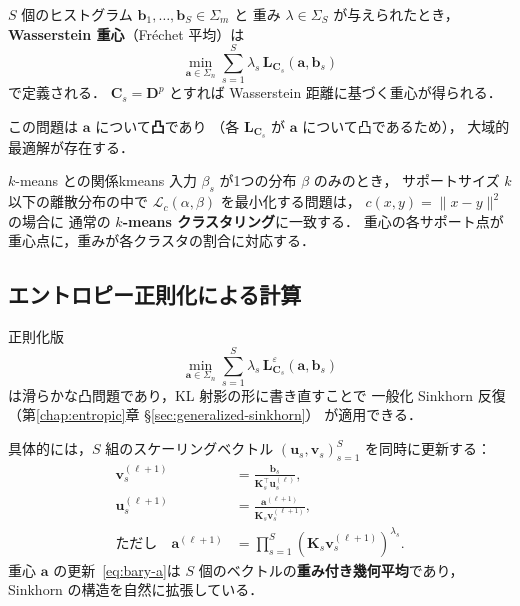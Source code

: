$S$ 個のヒストグラム $\mathbf{b}_1, \ldots, \mathbf{b}_S \in \Sigma_m$ と
重み $\lambda \in \Sigma_S$ が与えられたとき，
\textbf{Wasserstein 重心}（Fr\'echet 平均）は
\begin{equation}\label{eq:barycenter}
  \min_{\mathbf{a} \in \Sigma_n}
  \sum_{s=1}^S \lambda_s\, \mathbf{L}_{\mathbf{C}_s}(\mathbf{a}, \mathbf{b}_s)
\end{equation}
で定義される．
$\mathbf{C}_s = \mathbf{D}^p$ とすれば
Wasserstein 距離に基づく重心が得られる．

この問題は $\mathbf{a}$ について\textbf{凸}であり
（各 $\mathbf{L}_{\mathbf{C}_s}$ が $\mathbf{a}$ について凸であるため），
大域的最適解が存在する．

\begin{remark}{$k$-means との関係}{kmeans}
入力 $\beta_s$ が1つの分布 $\beta$ のみのとき，
サポートサイズ $k$ 以下の離散分布の中で
$\mathcal{L}_c(\alpha, \beta)$ を最小化する問題は，
$c(x,y) = \|x-y\|^2$ の場合に
通常の \textbf{$k$-means クラスタリング}に一致する．
重心の各サポート点が重心点に，重みが各クラスタの割合に対応する．
\end{remark}

\subsection{エントロピー正則化による計算}\label{subsec:entropic-barycenter}

正則化版
\begin{equation}\label{eq:entropic-barycenter}
  \min_{\mathbf{a} \in \Sigma_n}
  \sum_{s=1}^S \lambda_s\, \mathbf{L}^\varepsilon_{\mathbf{C}_s}(\mathbf{a}, \mathbf{b}_s)
\end{equation}
は滑らかな凸問題であり，KL 射影の形に書き直すことで
一般化 Sinkhorn 反復（第\ref{chap:entropic}章 §\ref{sec:generalized-sinkhorn}）
が適用できる．

具体的には，$S$ 組のスケーリングベクトル
$(\mathbf{u}_s, \mathbf{v}_s)_{s=1}^S$ を同時に更新する：
\begin{align}
  \mathbf{v}_s^{(\ell+1)} &= \frac{\mathbf{b}_s}
    {\mathbf{K}_s^\top \mathbf{u}_s^{(\ell)}}, \label{eq:bary-v} \\
  \mathbf{u}_s^{(\ell+1)} &= \frac{\mathbf{a}^{(\ell+1)}}
    {\mathbf{K}_s \mathbf{v}_s^{(\ell+1)}}, \label{eq:bary-u} \\
  \text{ただし}\quad
  \mathbf{a}^{(\ell+1)} &= \prod_{s=1}^S
    (\mathbf{K}_s \mathbf{v}_s^{(\ell+1)})^{\lambda_s}. \label{eq:bary-a}
\end{align}
重心 $\mathbf{a}$ の更新~\eqref{eq:bary-a}は
$S$ 個のベクトルの\textbf{重み付き幾何平均}であり，
Sinkhorn の構造を自然に拡張している．

